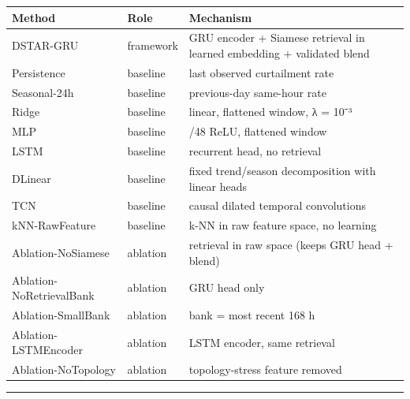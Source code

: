 \documentclass[
  10pt,
  a4paper,
]{article}
\begin{document}
\begin{longtable}[]{@{}
  >{\raggedright\arraybackslash}p{}
  >{\raggedright\arraybackslash}p{}
  >{\raggedright\arraybackslash}p{}@{}}
\toprule\noalign{}
\begin{minipage}[b]{\linewidth}\raggedright
Method
\end{minipage} & \begin{minipage}[b]{\linewidth}\raggedright
Role
\end{minipage} & \begin{minipage}[b]{\linewidth}\raggedright
Mechanism
\end{minipage} \\
\midrule\noalign{}
\endhead
\bottomrule\noalign{}
\endlastfoot
DSTAR-GRU & framework & GRU encoder + Siamese retrieval in learned
embedding + validated blend \\
Persistence & baseline & last observed curtailment rate \\
Seasonal-24h & baseline & previous-day same-hour rate \\
Ridge & baseline & linear, flattened window, λ = 10⁻³ \\
MLP & baseline & 96/48 ReLU, flattened window \\
LSTM & baseline & recurrent head, no retrieval \\
DLinear & baseline & fixed trend/season decomposition with linear
heads \\
TCN & baseline & causal dilated temporal convolutions \\
kNN-RawFeature & baseline & k-NN in raw feature space, no learning \\
Ablation-NoSiamese & ablation & retrieval in raw space (keeps GRU head +
blend) \\
Ablation-NoRetrievalBank & ablation & GRU head only \\
Ablation-SmallBank & ablation & bank = most recent 168 h \\
Ablation-LSTMEncoder & ablation & LSTM encoder, same retrieval \\
Ablation-NoTopology & ablation & topology-stress feature removed \\
\end{longtable}

\begin{center}\rule{0.5\linewidth}{0.5pt}\end{center}
\end{document}
